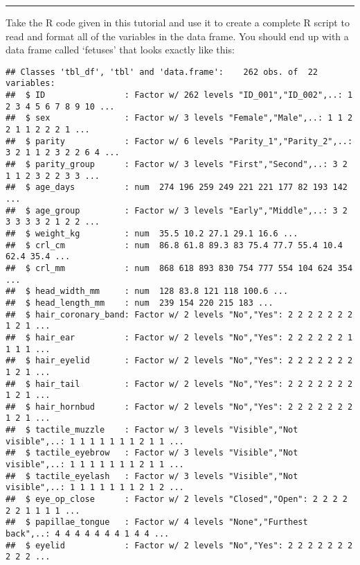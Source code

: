 \documentclass[
]{article}
\newenvironment{Shaded}{\begin{snugshade}}{\end{snugshade}}
\newcommand{\KeywordTok}[1]{\textcolor[rgb]{0.13,0.29,0.53}{\textbf{#1}}}
\newcommand{\NormalTok}[1]{#1}
\newcommand{\OperatorTok}[1]{\textcolor[rgb]{0.81,0.36,0.00}{\textbf{#1}}}
\newcommand{\StringTok}[1]{\textcolor[rgb]{0.31,0.60,0.02}{#1}}
\begin{document}
\begin{center}\rule{0.5\linewidth}{0.5pt}\end{center}

Take the R code given in this tutorial and use it to create a complete R
script to read and format all of the variables in the data frame. You
should end up with a data frame called `fetuses' that looks exactly like
this:

\begin{Shaded}
\end{Shaded}

\begin{verbatim}
## Classes 'tbl_df', 'tbl' and 'data.frame':    262 obs. of  22 variables:
##  $ ID                : Factor w/ 262 levels "ID_001","ID_002",..: 1 2 3 4 5 6 7 8 9 10 ...
##  $ sex               : Factor w/ 3 levels "Female","Male",..: 1 1 2 2 1 1 2 2 2 1 ...
##  $ parity            : Factor w/ 6 levels "Parity_1","Parity_2",..: 3 2 1 1 2 3 2 2 6 4 ...
##  $ parity_group      : Factor w/ 3 levels "First","Second",..: 3 2 1 1 2 3 2 2 3 3 ...
##  $ age_days          : num  274 196 259 249 221 221 177 82 193 142 ...
##  $ age_group         : Factor w/ 3 levels "Early","Middle",..: 3 2 3 3 3 3 2 1 2 2 ...
##  $ weight_kg         : num  35.5 10.2 27.1 29.1 16.6 ...
##  $ crl_cm            : num  86.8 61.8 89.3 83 75.4 77.7 55.4 10.4 62.4 35.4 ...
##  $ crl_mm            : num  868 618 893 830 754 777 554 104 624 354 ...
##  $ head_width_mm     : num  128 83.8 121 118 100.6 ...
##  $ head_length_mm    : num  239 154 220 215 183 ...
##  $ hair_coronary_band: Factor w/ 2 levels "No","Yes": 2 2 2 2 2 2 2 1 2 1 ...
##  $ hair_ear          : Factor w/ 2 levels "No","Yes": 2 2 2 2 2 2 1 1 1 1 ...
##  $ hair_eyelid       : Factor w/ 2 levels "No","Yes": 2 2 2 2 2 2 2 1 2 1 ...
##  $ hair_tail         : Factor w/ 2 levels "No","Yes": 2 2 2 2 2 2 2 1 2 1 ...
##  $ hair_hornbud      : Factor w/ 2 levels "No","Yes": 2 2 2 2 2 2 2 1 2 1 ...
##  $ tactile_muzzle    : Factor w/ 3 levels "Visible","Not visible",..: 1 1 1 1 1 1 1 2 1 1 ...
##  $ tactile_eyebrow   : Factor w/ 3 levels "Visible","Not visible",..: 1 1 1 1 1 1 1 2 1 1 ...
##  $ tactile_eyelash   : Factor w/ 3 levels "Visible","Not visible",..: 1 1 1 1 1 1 1 2 1 2 ...
##  $ eye_op_close      : Factor w/ 2 levels "Closed","Open": 2 2 2 2 2 2 1 1 1 1 ...
##  $ papillae_tongue   : Factor w/ 4 levels "None","Furthest back",..: 4 4 4 4 4 4 4 1 4 4 ...
##  $ eyelid            : Factor w/ 2 levels "No","Yes": 2 2 2 2 2 2 2 2 2 2 ...
\end{verbatim}
\end{document}
